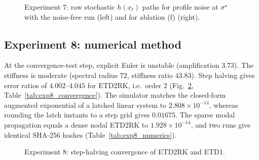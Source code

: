 \begin{figure}[t]\centering{}
\caption{Experiment 7: raw stochastic \(h(x_t)\) paths for profile noise at \(\sigma^\star\) with the noise-free run (left)
and for ablation (f) (right).}\label{fig:exp7}\end{figure}





\subsection{Experiment 8: numerical method}
At the convergence-test step, explicit Euler is unstable (amplification \(3.73\)). The stiffness is moderate
(spectral radius \(72\), stiffness ratio \(43.83\)). Step halving gives error ratios of
\(4.002\)--\(4.045\) for ETD2RK, i.e.\ order 2 (Fig.~\ref{fig:exp8}, Table~\ref{tab:exp8_convergence}).
The simulator matches the closed-form augmented exponential of a latched linear system to \(2.808\times10^{-14}\), whereas
rounding the latch instants to a step grid gives \(0.01675\). The sparse modal propagation equals a dense nodal
ETD2RK to \(1.928\times10^{-14}\), and two runs give identical SHA-256 hashes (Table~\ref{tab:exp8_numerics}).

\begin{figure}[t]\centering{}
\caption{Experiment 8: step-halving convergence of ETD2RK and ETD1.}\label{fig:exp8}\end{figure}



